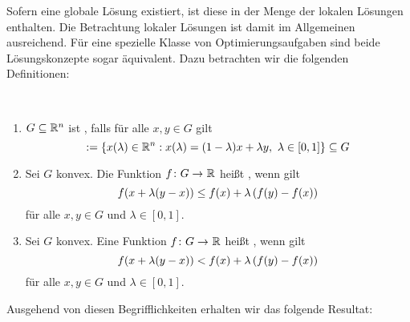 Sofern eine globale Lösung existiert, ist diese in der Menge der lokalen Lösungen enthalten. Die Betrachtung lokaler Lösungen ist damit im Allgemeinen ausreichend. Für eine spezielle Klasse von Optimierungsaufgaben sind beide Lösungskonzepte sogar äquivalent. Dazu betrachten wir die folgenden Definitionen:

\begin{definition}[Konvexität] %
	~
	\begin{enumerate}[nolistsep]
		\item $G \subseteq \mathbb{R}^n$ ist , falls für alle $x,y \in G$ gilt
		\begin{equation*}
			[x,y] \defeq \menge{x(\lambda) \in \Rn : x(\lambda) = (1-\lambda)x + \lambda y, \ \lambda \in [0,1]} \subseteq G
		\end{equation*}
		\item Sei $G$ konvex. Die Funktion $\abb{f}{G}{\R}$ heißt , wenn gilt
		\begin{equation*}
			f(x + \lambda (y-x)) \le f(x) + \lambda \left( f(y) - f(x) \right)
		\end{equation*}
		für alle $x,y \in G$ und $\lambda \in [0,1]$.
		\item  Sei $G$ konvex. Eine Funktion $\abb{f}{G}{\R}$ heißt , wenn gilt
		\begin{equation*}
			f(x + \lambda (y-x)) < f(x) + \lambda \left( f(y) - f(x) \right)
		\end{equation*}
		für alle $x,y \in G$ und $\lambda \in [0,1]$.
	\end{enumerate}
\end{definition}


\pagebreak

Ausgehend von diesen Begrifflichkeiten erhalten wir das folgende Resultat:

